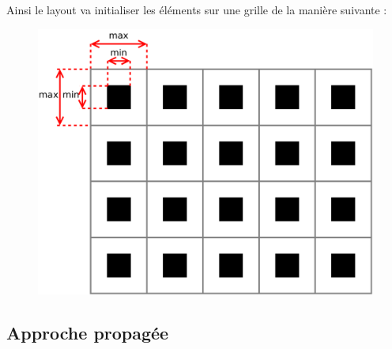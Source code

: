 Ainsi le layout va initialiser les éléments sur une grille de la manière suivante :
\begin{figure}[H]
  \includegraphics[width=\textwidth]{../resources/illustrations/grob_app_init}
\end{figure}


\subsection{Approche propagée}